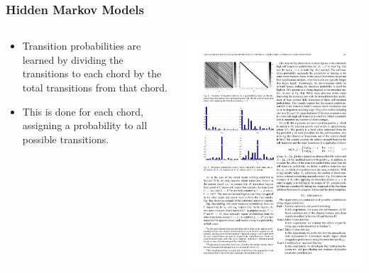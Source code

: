 \documentclass{beamer}
\begin{document}
\begin{frame}
	\frametitle{Hidden Markov Models}
	
	\begin{columns}
	\begin{column}{.6\textwidth}
		\begin{itemize}
			\item Transition probabilities are learned by dividing the transitions to each chord by the total transitions from that chord.
			\item This is done for each chord, assigning a probability to all possible transitions.
		\end{itemize}
	\end{column}
	\begin{column}{.4\textwidth}
	\includegraphics[width=.95\textwidth]{transitionProbabilities.pdf} \\

\end{column}
\end{columns}
\end{frame}
\end{document}

